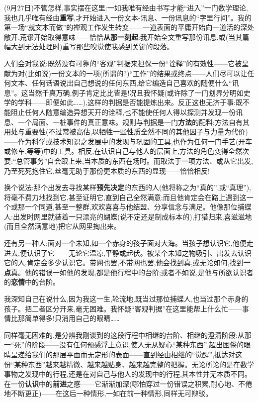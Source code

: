 
(9月27日)不管怎样,事实摆在这里:一如我唯有经由书写才能“进入”一门数学理论,我也几乎唯有经由\textbf{重写},才开始进入一份文本-讯息、一份讯息的“字里行间”。我的第一场“就文本而做”的禅观工作发生转变——一道表面的平庸开始向一道活的深处敞开,荒谬开始取得意味——恰恰\textbf{从那一刻起}:我开始全文重写那份讯息,或(当其篇幅大到无法处理时)重写那些嗅觉使我感到关键的段落。

人们会对我说:既然没有可靠的“客观”判据来担保一份“诠释”的有效性——它被呈献为对(比如说)一份文本的一项(所谓的?)“工作”的结果或终点——人们尽可以让任何文本、任何话语说出自己想说的任何东西,给它编造自己喜欢的随便什么“讯息”。这当然千真万确,例子肯定比比皆是!况且我怀疑(或许除了一门划界分明如史学的学科——即便如此……),这样的判据是否能提炼出来。反正这也无济于事:既不能阻止任何人随意编造异想天开的诠释,也不能使任何人得以探测并发现一份讯息、一个局面、一桩事件的真正意味。规则与判据是一门\textbf{方法}的配料;方法自有其用处与重要性(不过常被高估,以牺牲一些性质全然不同的其他因子与力量为代价)——作为科学或技术知识之发展中的发现与巩固的工具,也作为任何一门手艺(开车或修车,等等)中的工具。相反,在认识自己与他人的层面上,方法的角色变得全然次要:“总管事务”自会跟上来,当本质的东西在场时。而取法于一项方法、或从它出发,乃至死死抱住它,丝毫无助于那份更本质的东西的显现——恰恰相反!

换个说法:那个出发去寻找某样\textbf{预先决定}\dmark{}的东西的人(他将称之为“真的”,或“真理”),将毫不费力地找到它,甚至证明它,直到自己全然满意;而且他肯定会在路上遇到这一个或那一个同道,甚至一整群,欢欢喜喜与他结盟、分享信念与满足。他像那位捕蝶人:出发时网里就装着一只漂亮的蝴蝶(说不定还是制成标本的),打猎归来,喜滋滋地(而且全然满意地)把它从网里掏出来。

还有另一种人:面对一个未知,如一个赤身的孩子面对大海。当孩子想认识它,他便走进去,便认识了它——无论它温凉,平静或起伏。被某个未知之物吸引、出发去认识它的人,肯定会多少认识它。带网也罢,不带网也罢,他会找到真,或无论如何,找到\textbf{一点}真。他的错误一如他的发现,都是他行程中的台阶;或者不如说,是他与所欲认识者的\textbf{恋情}中的台阶。

我深知自己在说什么,因为我这一生,轮流地,既当过那位捕蝶人,也当过那个赤身的孩子。把二者区分开来,毫无困难。我怀疑“客观判据”在这里能帮上什么忙——事情比那简单得多!只消用自己的眼睛……

同样毫无困难的,是分辨我刚谈到的这段行程中相继的台阶、相继的澄清阶段:从那一“死”的阶段——没有任何预感浮上意识,使人无从疑心“某种东西”,超出困倦的眼睛呈递给我们的那层平面而无定形的表面——直到经由相继的“觉醒”,抵达对这份“某种东西”越来越精微、越来越贴身、越来越完整的把握。无论所论的是在数学事物之发现中的行程,还是在对自己与他人的发现中的行程,其本性并无本质不同。在一份\textbf{认识}中的\textbf{前进}之感——它渐渐加深(哪怕穿过一份错误之积累,耐心地、不倦地不断更正)——在这后一种情形,一如在前一种情形,同样无可辩驳。

